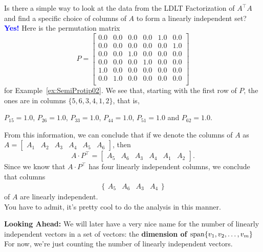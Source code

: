 \vspace*{.2cm}

\begin{tcolorbox}[title=\textbf{Identifying the Linearly Independent Vectors}]
 Is there a simple way to look at the data from the LDLT Factorization of $A^\top A$ and find a specific choice of columns of $A$ to form a linearly independent set? \textcolor{blue}{\bf Yes!} Here is the permutation matrix
\begin{equation}
P= \left[
\begin{array}{cccccc}
0.0 & 0.0 & 0.0 & 0.0 & 1.0 & 0.0 \\
0.0 & 0.0 & 0.0 & 0.0 & 0.0 & 1.0 \\
0.0 & 0.0 & 1.0 & 0.0 & 0.0 & 0.0 \\
0.0 & 0.0 & 0.0 & 1.0 & 0.0 & 0.0 \\
1.0 & 0.0 & 0.0 & 0.0 & 0.0 & 0.0 \\
0.0 & 1.0 & 0.0 & 0.0 & 0.0 & 0.0 \\
\end{array}
\right]
\end{equation}
for Example~\ref{ex:SemiProtip02}.
We see that, starting with the first row of $P$, the ones are in columns $\{5, 6, 3, 4, 1, 2 \}$, that is,
\begin{center}
 $P_{15}=1.0$, $P_{26}=1.0$, $P_{33}=1.0$, $P_{44}=1.0$, $P_{51}=1.0$ and $P_{62}=1.0$.   
\end{center} From this information, we can conclude that if we denote the columns of $A$ as $A=\left[\begin{array}{cccccc} A_1 & A_2 & A_3 & A_4 & A_5 & A_6\end{array} \right]$, then 
$$A \cdot P^\top = \left[\begin{array}{cccccc} A_5 & A_6 & A_3 & A_4 & A_1 & A_2 \end{array}\right]. $$
Since we know that $A \cdot P^\top$ has four linearly independent columns, we conclude that columns 
$$\{\begin{array}{cccc} A_5 & A_6 & A_3 & A_4  \end{array} \} $$
of $A$ are linearly independent.\\

You have to admit, it's pretty cool to do the analysis in this manner. 
\end{tcolorbox}

\textbf{Looking Ahead:} We will later have a very nice name for the number of linearly independent vectors in a set of vectors: the \textbf{dimension of $\mathrm{span} \{ v_1, v_2, \dots, v_m \}$} For now, we're just counting the number of linearly independent vectors.\\

